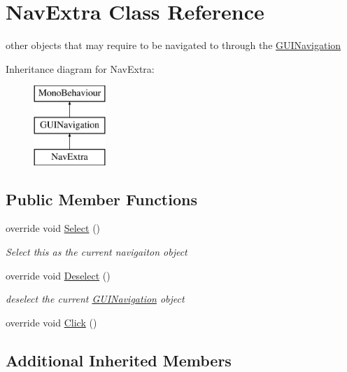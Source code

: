 \hypertarget{class_nav_extra}{}\section{Nav\+Extra Class Reference}
\label{class_nav_extra}


other objects that may require to be navigated to through the \mbox{\hyperlink{class_g_u_i_navigation}{G\+U\+I\+Navigation}}  


Inheritance diagram for Nav\+Extra\+:\begin{figure}[H]
\begin{center}
\leavevmode
\includegraphics[height=3.000000cm]{class_nav_extra}
\end{center}
\end{figure}
\subsection*{Public Member Functions}
\begin{DoxyCompactItemize}
\item 
override void \mbox{\hyperlink{class_nav_extra_abebcfc80eaf380a014c7865dc7a7bf8e}{Select}} ()
\begin{DoxyCompactList}\small\item\em Select this as the current navigaiton object \end{DoxyCompactList}\item 
override void \mbox{\hyperlink{class_nav_extra_a31e644667449d9080e324212724ac29d}{Deselect}} ()
\begin{DoxyCompactList}\small\item\em deselect the current \mbox{\hyperlink{class_g_u_i_navigation}{G\+U\+I\+Navigation}} object \end{DoxyCompactList}\item 
override void \mbox{\hyperlink{class_nav_extra_aa4325eb5cc7289d582ffda1a617dd093}{Click}} ()
\end{DoxyCompactItemize}
\subsection*{Additional Inherited Members}


